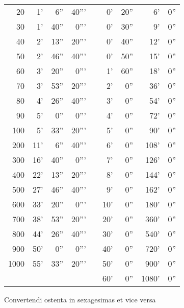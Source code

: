 \begin{tabnums}
\begin{tabular}{@{} r r r r  c r r r r }
  20 &  1' &  6'' & 40''' & &  0' & 20'' &    6' &   0'' \\
  30 &  1' & 40'' &  0''' & &  0' & 30'' &    9' &   0'' \\
  40 &  2' & 13'' & 20''' & &  0' & 40'' &   12' &   0'' \\
  50 &  2' & 46'' & 40''' & &  0' & 50'' &   15' &   0'' \\
  60 &  3' & 20'' &  0''' & &  1' & 60'' &   18' &   0'' \\
  70 &  3' & 53'' & 20''' & &  2' &  0'' &   36' &   0'' \\
  80 &  4' & 26'' & 40''' & &  3' &  0'' &   54' &   0'' \\
  90 &  5' &  0'' &  0''' & &  4' &  0'' &   72' &   0'' \\
 100 &  5' & 33'' & 20''' & &  5' &  0'' &   90' &   0'' \\
 200 & 11' &  6'' & 40''' & &  6' &  0'' &  108' &   0'' \\
 300 & 16' & 40'' &  0''' & &  7' &  0'' &  126' &   0'' \\
 400 & 22' & 13'' & 20''' & &  8' &  0'' &  144' &   0'' \\
 500 & 27' & 46'' & 40''' & &  9' &  0'' &  162' &   0'' \\
 600 & 33' & 20'' &  0''' & & 10' &  0'' &  180' &   0'' \\
 700 & 38' & 53'' & 20''' & & 20' &  0'' &  360' &   0'' \\
 800 & 44' & 26'' & 40''' & & 30' &  0'' &  540' &   0'' \\
 900 & 50' &  0'' &  0''' & & 40' &  0'' &  720' &   0'' \\
1000 & 55' & 33'' & 20''' & & 50' &  0'' &  900' &   0'' \\
\multicolumn{4}{c}{}      & & 60' &  0'' & 1080' &   0'' \\
\bottomrule
\end{tabular}
%
\caption{Convertendi ostenta in sexagesimas et vice versa}
\label{tab:p006}
\end{tabnums}
